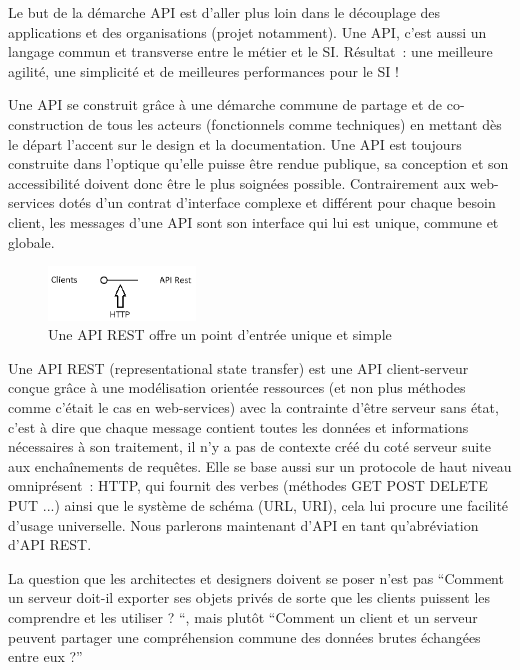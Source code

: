     Le but de la démarche API est d’aller plus loin dans le découplage des applications et des organisations (projet notamment).
    Une API, c’est aussi un langage commun et transverse entre le métier et le SI.
    Résultat : une meilleure agilité, une simplicité et de meilleures performances pour le SI !

    Une API se construit grâce à une démarche commune de partage et de co-construction de tous les acteurs (fonctionnels comme techniques) en mettant dès le départ l'accent sur le design et la documentation.
    Une API est toujours construite dans l’optique qu’elle puisse être rendue publique, sa conception et son accessibilité doivent donc être le plus soignées possible.
    Contrairement aux web-services dotés d’un contrat d’interface complexe et différent pour chaque besoin client, les messages d’une API sont son interface qui lui est  unique, commune et globale.

    \begin{figure}[!ht]
        \center
        \includegraphics[width=0.35\textwidth]{./images/api-rest.jpg}
        \caption{Une API REST offre un point d'entrée unique et simple}
    \end{figure}

    Une API REST (representational state transfer) est une API client-serveur conçue grâce à une modélisation orientée ressources (et non plus méthodes comme c’était le cas en web-services) avec la contrainte d’être serveur sans état, c’est à dire que chaque message contient toutes les données et informations nécessaires à son traitement, il n’y a pas de contexte créé du coté serveur suite aux enchaînements de requêtes.
    Elle se base aussi sur un protocole de haut niveau omniprésent : HTTP, qui fournit des verbes (méthodes GET POST DELETE PUT ...) ainsi que le système de schéma (URL, URI), cela lui procure une facilité d’usage universelle.
    Nous parlerons maintenant d’API en tant qu’abréviation d’API REST.

    La question que les architectes et designers doivent se poser n’est pas
    “Comment un serveur doit-il exporter ses objets privés de sorte que les clients puissent les comprendre et les utiliser ? “, mais plutôt
    “Comment un client et un serveur peuvent partager une compréhension commune des données brutes échangées entre eux ?”\,

